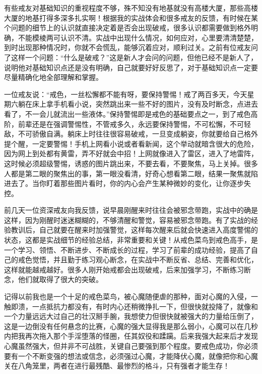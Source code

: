 有些戒友对基础知识的重视程度不够，殊不知没有地基就没有高楼大厦，那些高楼大厦的地基打得多深多扎实啊！根据我的实战体会和很多戒友的反馈，有时候在某个问题的细节上的认识就直接决定着是否会出现破戒，很多认识都需要做到格外明确，不能模棱两可认识不清。实战中出现什么情况，如何应对，心里要清清楚楚，到时出现那种情况时，你就不会慌乱，能够沉着应对，顺利过关。之前有位戒友问了这样一个问题：“什么是破戒？”这是新人才会问的问题，但他已经不是新人了，说明他对基础知识点还是没有明确，自己就要好好反思了，对于基础知识点一定要尽量精确化地全部理解和掌握。

一位戒友说：“戒色，一丝松懈都不能有呀，要保持警惕！戒了两百多天，今天星期六躺在床上拿手机看小说，突然跳出来一些不好的图片，没有及时断念，点进去看了，不一会儿就流出一些液体。”保持警惕即是戒色的基础要点之一，到了戒色高阶，前辈还是在强调警惕性，不管戒多久，永远要保持警惕，不可松懈，不可轻敌，不可骄傲自满。躺床上时往往很容易破戒，一旦变成躺姿，你就要给自己格外提个醒，一定要警惕！手机上网看小说或者看新闻，这个举动就暗含很大的危险，因为网上到处都有黄雷，弄不好就会中招！上网就像进入了雷区，进入了地雷阵，这时候必须超级警惕，诱惑的图片跳出来，不要去看，不要聚焦，马上关掉。很多人都是第二眼的聚焦出的事，第一眼没看清，好奇心想看第二眼，结果一聚焦就陷进去了。当你盯着那些图片看时，你的内心会产生某种微妙的变化，让你逐步失控。

前几天一位资深戒友向我反馈，说早晨刚醒来时往往会被邪念带跑，实战中的确是这样，因为刚醒时迷迷糊糊的，不够清醒和警觉，容易被邪念带跑。有了实战的经验教训后，自己就要在醒来时加强警觉，这样每次醒来后就会快速进入高度警惕的状态，这都是实战细节的经验总结，非常重要和关键！从戒色菜鸟到戒色高手，是一个学习、领悟、不断进步、不断成长的过程，学习了前辈的成功经验，提高了自己的戒色觉悟，并且勤于练习观心断念，在实战中不断反省、总结、完善和优化，这样就能越戒越好。很多人刚开始戒都会出现破戒，后来加强学习，不断练习断念，他们就取得了很大的突破。

记得以前我也是一个十足的戒色菜鸟，被心魔随便虐的那种，面对心魔的入侵，一触即溃，一点抵抗力都没有，有时内心还稍微挣扎一下，但很快就投降了，就像和一个力量远远大过自己的壮汉掰手腕，我想使力但很快就被强大的力量给压倒了，这是一边倒没有任何悬念的比赛，心魔的强大显得我是那么弱小，心魔可以在几秒内把我再次拖入那个手淫堕落的怪圈，任其奴役和蹂躏。后来我强大起来后才发现心魔虽然强大，但并非不可战胜，关键自己要强到那个程度。要戒色成功，你必须要有一个不断变强的想法或信念，必须强过心魔，才能降伏心魔，就像把你和心魔关在八角笼里，两者在进行最残酷、最惨烈的格斗，只有强者才能生存！

